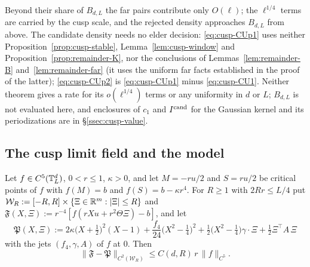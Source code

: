Beyond their share of $B_{d,L}$ the far pairs contribute only $O(\ell)$; the $\ell^{1/4}$ terms are carried by the cusp scale, and the rejected density approaches $B_{d,L}$ from above. The candidate density needs no elder decision: \eqref{eq:cusp-CUp1} uses neither Proposition~\ref{prop:cusp-stable}, Lemma~\ref{lem:cusp-window} and Proposition~\ref{prop:remainder-K}, nor the conclusions of Lemmas~\ref{lem:remainder-B} and~\ref{lem:remainder-far} (it uses the uniform far facts established in the proof of the latter); \eqref{eq:cusp-CUp2} is \eqref{eq:cusp-CUp1} minus \eqref{eq:cusp-CU1}. Neither theorem gives a rate for its $o(\ell^{1/4})$ terms or any uniformity in $d$ or $L$; $B_{d,L}$ is not evaluated here, and enclosures of $c_1$ and $I^{\mathrm{cand}}$ for the Gaussian kernel and its periodizations are in \S\ref{ssec:cusp-value}.

\subsection{The cusp limit field and the model}\label{ssec:cusp-model}

\begin{theorem}\label{thm:cusp-field}
Let $f\in C^5(\mathbb T^d_L)$, $0<r\le1$, $\kappa>0$, and let $M=-ru/2$ and $S=ru/2$ be critical points of $f$ with $f(M)=b$ and $f(S)=b-\kappa r^4$. For $R\ge1$ with $2Rr\le L/4$ put $\mathcal W_R:=[-R,R]\times\{\Xi\in\mathbb R^m:|\Xi|\le R\}$ and $\mathfrak F(X,\Xi):=r^{-4}[f(rXu+r^2\Theta\Xi)-b]$, and let
\begin{equation}\label{eq:cusp-P}
\mathfrak P(X,\Xi):=2\kappa\bigl(X+\tfrac12\bigr)^2(X-1)+\frac{f_4}{24}\bigl(X^2-\tfrac14\bigr)^2+\tfrac12\bigl(X^2-\tfrac14\bigr)\gamma\cdot\Xi+\tfrac12\Xi^{\top}A\,\Xi
\end{equation}
with the jets $(f_4,\gamma,A)$ of $f$ at $0$. Then
\begin{equation}\label{eq:cusp-FP}
\|\mathfrak F-\mathfrak P\|_{C^2(\mathcal W_R)}\le C(d,R)\,r\,\|f\|_{C^5}.
\end{equation}
\end{theorem}

